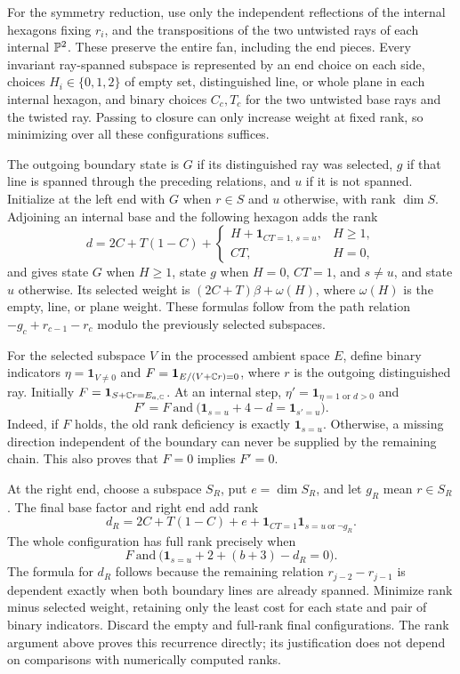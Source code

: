 For the symmetry reduction, use only the independent reflections of the
internal hexagons fixing $r_i$, and the transpositions of the two untwisted rays of each internal
$\mathbb{P}^2$. These preserve the entire fan, including the end pieces.
Every invariant ray-spanned subspace is represented by an end choice
on each side, choices $H_i\in\{0,1,2\}$ of empty set, distinguished line,
or whole plane in each internal hexagon, and binary choices $C_c,T_c$
for the two untwisted base rays and the twisted ray. Passing to closure
can only increase weight at fixed rank, so minimizing over all these
configurations suffices.

The outgoing boundary state is $G$ if its distinguished ray was selected,
$g$ if that line is spanned through the preceding relations, and $u$ if
it is not spanned. Initialize at the left end with $G$ when $r\in S$
and $u$ otherwise, with rank $\dim S$. Adjoining an internal base and
the following hexagon adds the rank
\[
 d=2C+T(1-C)+
 \begin{cases}
 H+\mathbf1_{CT=1,\,s=u},&H\ge1,\\
 CT,&H=0,
 \end{cases}
\]
and gives state $G$ when $H\ge1$, state $g$ when $H=0$, $CT=1$,
and $s\ne u$, and state $u$ otherwise. Its selected weight is
$(2C+T)\beta+\omega(H)$, where $\omega(H)$ is the empty, line,
or plane weight. These formulas follow from the path relation
$-g_c+r_{c-1}-r_c$ modulo the previously selected subspaces.

For the selected subspace $V$ in the processed ambient space $E$, define
binary indicators $\eta=\mathbf1_{V\ne0}$ and
$F=\mathbf1_{E/(V+\mathbb{C} r)=0}$, where $r$ is the outgoing distinguished
ray. Initially $F=\mathbf1_{S+\mathbb{C} r=E_{a,\mathbb{C}}}$. At an internal step,
$\eta'=\mathbf1_{\eta=1\text{ or }d>0}$ and
\[
 F'=F\ \text{and}\ \bigl(\mathbf1_{s=u}+4-d
                              =\mathbf1_{s'=u}\bigr).
\]
Indeed, if $F$ holds, the old rank deficiency is exactly
$\mathbf1_{s=u}$. Otherwise, a missing direction independent of the
boundary can never be supplied by the remaining chain. This also proves
that $F=0$ implies $F'=0$.

At the right end, choose a subspace $S_R$, put $e=\dim S_R$, and let
$g_R$ mean $r\in S_R$. The final base factor and right end add rank
\[
 d_R=2C+T(1-C)+e+\mathbf1_{CT=1}\mathbf1_{s=u\ \mathrm{or}\ \neg g_R}.
\]
The whole configuration has full rank precisely when
\[
 F\ \text{and}\ \bigl(\mathbf1_{s=u}+2+(b+3)-d_R=0\bigr).
\]
The formula for $d_R$ follows because the remaining relation
$r_{j-2}-r_{j-1}$ is dependent exactly when both boundary lines are
already spanned. Minimize rank minus selected weight, retaining only
the least cost for each state and pair of binary indicators. Discard the empty
and full-rank final configurations. The rank argument above proves this
recurrence directly; its justification does not depend on comparisons
with numerically computed ranks.

